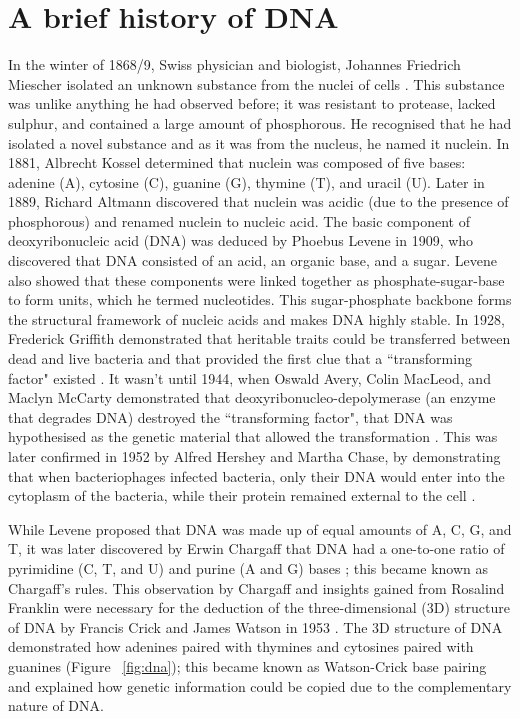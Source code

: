 \section{A brief history of DNA}

In the winter of 1868/9, Swiss physician and biologist, Johannes Friedrich Miescher isolated an unknown substance from the nuclei of cells \citep{dahm2008discovering}. This substance was unlike anything he had observed before; it was resistant to protease, lacked sulphur, and contained a large amount of phosphorous. He recognised that he had isolated a novel substance and as it was from the nucleus, he named it nuclein. In 1881, Albrecht Kossel determined that nuclein was composed of five bases: adenine (A), cytosine (C), guanine (G), thymine (T), and uracil (U). Later in 1889, Richard Altmann discovered that nuclein was acidic (due to the presence of phosphorous) and renamed nuclein to nucleic acid. The basic component of deoxyribonucleic acid (DNA) was deduced by Phoebus Levene in 1909, who discovered that DNA consisted of an acid, an organic base, and a sugar. Levene also showed that these components were linked together as phosphate-sugar-base to form units, which he termed nucleotides. This sugar-phosphate backbone forms the structural framework of nucleic acids and makes DNA highly stable. In 1928, Frederick Griffith demonstrated that heritable traits could be transferred between dead and live bacteria and that provided the first clue that a ``transforming factor" existed \citep{griffith1928significance}. It wasn't until 1944, when Oswald Avery, Colin MacLeod, and Maclyn McCarty demonstrated that deoxyribonucleo-depolymerase (an enzyme that degrades DNA) destroyed the ``transforming factor", that DNA was hypothesised as the genetic material that allowed the transformation \citep{avery1944studies}. This was later confirmed in 1952 by Alfred Hershey and Martha Chase, by demonstrating that when bacteriophages infected bacteria, only their DNA would enter into the cytoplasm of the bacteria, while their protein remained external to the cell \citep{hershey1952independent}.

While Levene proposed that DNA was made up of equal amounts of A, C, G, and T, it was later discovered by Erwin Chargaff that DNA had a one-to-one ratio of pyrimidine (C, T, and U) and purine (A and G) bases \citep{pmid14938364, pmid14945441}; this became known as Chargaff's rules. This observation by Chargaff and insights gained from Rosalind Franklin were necessary for the deduction of the three-dimensional (3D) structure of DNA by Francis Crick and James Watson in 1953 \citep{WATSON_1953}. The 3D structure of DNA demonstrated how adenines paired with thymines and cytosines paired with guanines (Figure ~\ref{fig:dna}); this became known as Watson-Crick base pairing and explained how genetic information could be copied due to the complementary nature of DNA.

